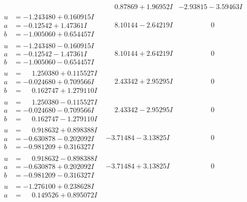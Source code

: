 \documentclass[1p]{elsarticle_modified}
\theoremstyle{definition}
\begin{document}
$$\begin{array}{c|c|c}
 & \phantom{-}0.87869 + 1.96952 I & -2.93815 - 3.59463 I \\ \hline\begin{aligned}
u &= -1.243480 + 0.160915 I \\
a &= -0.12542 + 1.47361 I \\
b &= -1.005060 + 0.654457 I\end{aligned}
 & \phantom{-}8.10144 - 2.64219 I & \phantom{-0.000000 } 0 \\ \hline\begin{aligned}
u &= -1.243480 - 0.160915 I \\
a &= -0.12542 - 1.47361 I \\
b &= -1.005060 - 0.654457 I\end{aligned}
 & \phantom{-}8.10144 + 2.64219 I & \phantom{-0.000000 } 0 \\ \hline\begin{aligned}
u &= \phantom{-}1.250380 + 0.115527 I \\
a &= -0.024680 + 0.709566 I \\
b &= \phantom{-}0.162747 + 1.279110 I\end{aligned}
 & \phantom{-}2.43342 + 2.95295 I & \phantom{-0.000000 } 0 \\ \hline\begin{aligned}
u &= \phantom{-}1.250380 - 0.115527 I \\
a &= -0.024680 - 0.709566 I \\
b &= \phantom{-}0.162747 - 1.279110 I\end{aligned}
 & \phantom{-}2.43342 - 2.95295 I & \phantom{-0.000000 } 0 \\ \hline\begin{aligned}
u &= \phantom{-}0.918632 + 0.898388 I \\
a &= -0.630878 - 0.202092 I \\
b &= -0.981209 + 0.316327 I\end{aligned}
 & -3.71484 - 3.13825 I & \phantom{-0.000000 } 0 \\ \hline\begin{aligned}
u &= \phantom{-}0.918632 - 0.898388 I \\
a &= -0.630878 + 0.202092 I \\
b &= -0.981209 - 0.316327 I\end{aligned}
 & -3.71484 + 3.13825 I & \phantom{-0.000000 } 0 \\ \hline\begin{aligned}
u &= -1.276100 + 0.238628 I \\
a &= \phantom{-}0.149526 + 0.895072 I \\

\end{aligned}
\end{array}$$
\end{document}

